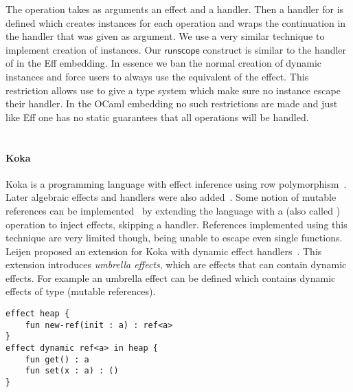 The  operation takes as arguments an effect and a handler.
Then a handler for  is defined which creates instances for each  operation and wraps the continuation in the handler that was given as argument.
We use a very similar technique to implement creation of instances.
Our $\mathsf{runscope}$ construct is similar to the handler of  in the Eff embedding.
In essence we ban the normal creation of dynamic instances and force users to always use the equivalent of the  effect.
This restriction allows use to give a type system which make sure no instance escape their handler.
In the OCaml embedding no such restrictions are made and just like Eff one has no static guarantees that all operations will be handled.
\\\\
\paragraph{Koka}
Koka is a programming language with effect inference using row polymorphism~\autocite{koka}.
Later algebraic effects and handlers were also added~\autocite{koka2}.
Some notion of mutable references can be implemented~\autocite{handlewithcare} by extending the language with a  (also called ) operation to inject effects, skipping a handler.
References implemented using this technique are very limited though, being unable to escape even single functions.
Leijen proposed an extension for Koka with dynamic effect handlers~\autocite{kokadynamic}.
This extension introduces \emph{umbrella effects}, which are effects that can contain dynamic effects.
For example an umbrella effect  can be defined which contains dynamic effects of type  (mutable references).
\begin{verbatim}
effect heap {
	fun new-ref(init : a) : ref<a>
}
effect dynamic ref<a> in heap {
	fun get() : a
	fun set(x : a) : ()
}
\end{verbatim}


